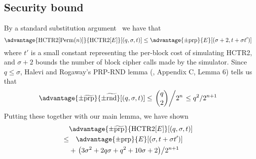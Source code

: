 \documentclass[hctr.tex]{subfiles}
\begin{document}
\subsection{Security bound}
By a standard substitution argument~\cite{cbcsec,concrete} we have that
\begin{displaymath}
    \advantage{\HCTR[\Perm(n)]}{\HCTR[E]}[(q, \sigma, t)]
    \leq \advantage{\pm \mathrm{prp}}{E}[(\sigma + 2, t + \sigma t')]
\end{displaymath}
where \(t'\) is a small constant
representing the per-block cost of simulating HCTR2, and
\(\sigma + 2\) bounds the number of block cipher calls made by the simulator.
Since \(q \leq \sigma\), Halevi and Rogaway's PRP-RND lemma
(\cite{cmc}, Appendix C, Lemma 6) tells us that
\begin{displaymath}
    \advantage{\pm \widetilde{\mathrm{prp}}}{\pm\widetilde{\mathrm{rnd}}}[(q, \sigma, t)] 
    \leq \left.\binom{q}{2}\middle/2^n\right.
    \leq q^2/2^{n+1}
\end{displaymath}
Putting these together with our main lemma, we have shown
\begin{align*}
    &\advantage{\pm \widetilde{\mathrm{prp}}}{\HCTR[E]}[(q, \sigma, t)] \\
    \leq & \quad \advantage{\pm \mathrm{prp}}{E}[(\sigma, t + \sigma t')] \\
    &+ \left.\left(3\sigma^2 + 2q\sigma + q^2 + 10\sigma + 2\right)\middle/2^{n+1}\right. \\
\end{align*}
\end{document}
